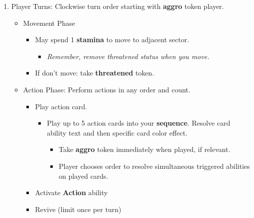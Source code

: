 \documentclass[12pt]{article}
\newenvironment{enumerateCustom}
{\begin{enumerate}
  \setlength{\itemsep}{1pt}
  \setlength{\parskip}{0pt}
  \setlength{\parsep}{0pt}}
{\end{enumerate}}
\newenvironment{itemizeCustom}
{\begin{itemize}
  \setlength{\itemsep}{1pt}
  \setlength{\parskip}{0pt}
  \setlength{\parsep}{0pt}}
{\end{itemize}}
\begin{document}
\begin{mdframed}[style=SummaryCard, align=center, userdefinedwidth=35em, frametitle={Round Order Guide}]
\begin{enumerateCustom}
        \item Player Turns: Clockwise turn order starting with \textbf{aggro} token player.
            \begin{itemizeCustom}
                \item Movement Phase
                    \begin{itemizeCustom}
                        \item May spend 1 \textbf{stamina} to move to adjacent sector.
                            \begin{itemizeCustom}
                                \item \textit{Remember, remove threatened status when you move.}
                            \end{itemizeCustom}
                        \item If don't move: take \textbf{threatened} token.
                    \end{itemizeCustom}
                \item Action Phase: Perform actions in any order and count.
                    \begin{itemizeCustom}
                        \item Play action card.
                            \begin{itemizeCustom}
                                \item Play up to 5 action cards into your \textbf {sequence}. Resolve card ability text and then specific card color effect.
                                    \begin{itemizeCustom}
                                        \item Take \textbf{aggro} token immediately when played, if relevant.
                                        \item Player chooses order to resolve simultaneous triggered abilities on played cards.
                                    \end{itemizeCustom}
                            \end{itemizeCustom}
                        \item Activate \textbf{Action} ability
                        \item Revive (limit once per turn)


\end{itemizeCustom}
\end{itemizeCustom}
\end{enumerateCustom}
\end{mdframed}
\end{document}
